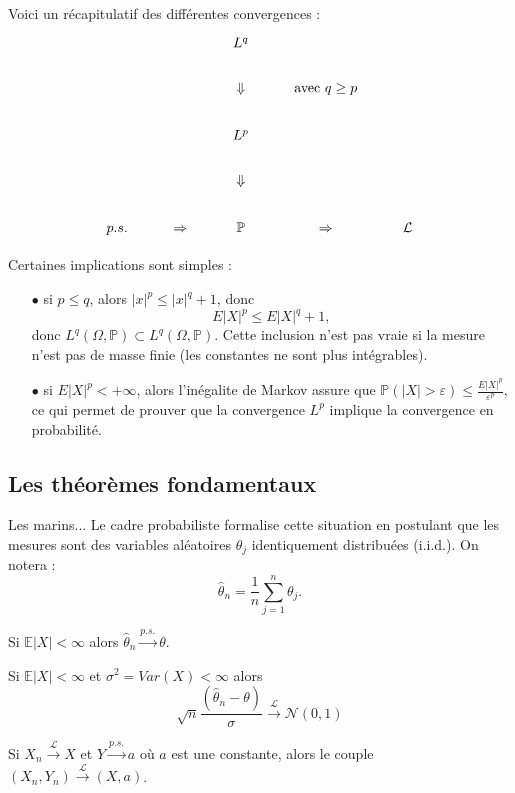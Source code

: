 Voici un récapitulatif des différentes convergences :
\[\begin{tikzcd}
     &              & L^q  &                   &          \\
     &              & \Downarrow &    \text{avec }q \geq p       &            \\
     &              & L^p     &               &            \\
     &              & \Downarrow &           &            \\
p.s. & \Rightarrow  & \mathbb P & \Rightarrow & \mathcal L
\end{tikzcd}\]

Certaines implications sont simples :
\begin{itemize}
\item[$\bullet$] si $p\leq q$, alors $|x|^p\leq |x|^q+1$, donc \[E|X|^p \leq E|X|^q + 1,\] 
donc $L^q(\Omega,\mathbb P) \subset L^q(\Omega,\mathbb P) $. Cette inclusion n'est pas vraie si la mesure n'est pas de masse finie (les constantes ne sont plus intégrables).
\item[$\bullet$] si $E|X|^p< + \infty$, alors l'inégalite de Markov assure que $\mathbb P (|X|>\varepsilon) \leq \frac{E|X|^p}{\varepsilon^p}$, ce qui permet de prouver que la convergence $L^p$ implique la convergence en probabilité.
\end{itemize}
\subsection{Les théorèmes fondamentaux}

Les marins... Le cadre probabiliste formalise cette situation en postulant que les mesures sont des variables aléatoires $\theta_j$ identiquement distribuées (i.i.d.). On notera : 
\[\hat\theta_n = \frac{1}{n}\sum_{j=1}^n \theta_j.\]

\begin{thm}[LGN]
Si $\mathbb E |X|<\infty $ alors $\hat \theta_n \overset{p.s.}{\longrightarrow}\theta$.
\end{thm}

\begin{thm}[TCL]
Si $\mathbb E |X|<\infty $ et $\sigma^2=Var(X)<\infty$ alors \[\sqrt{n}\frac{(\hat \theta_n -\theta)}{\sigma}\overset{\mathcal L}{\longrightarrow}\mathcal{N}(0,1)\]
\end{thm}

\begin{lem}[Slutsky]
Si $X_n \overset{\mathcal L}{\longrightarrow} X$ et $Y \overset{p.s.}{\longrightarrow}a$ où $a$ est une constante, alors le couple $(X_n,Y_n) \overset{\mathcal L}{\longrightarrow} (X,a)$.
\end{lem}

